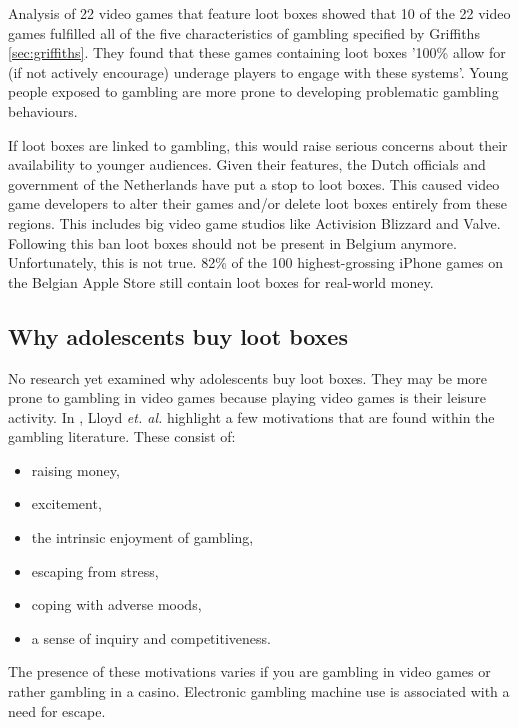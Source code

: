 \documentclass[10pt,twoside,english,a4paper]{coursepaper}
\begin{document}
	Analysis of 22 video games\cite{nature:psycho} that feature loot boxes showed that 10 of the 22 video games fulfilled all of the five characteristics of gambling specified by Griffiths \ref{sec:griffiths}.  They found that these games containing loot boxes  '100\% allow for (if not actively encourage) underage players to engage with these systems'. Young people exposed to gambling are more prone to developing problematic gambling behaviours\cite{springer:risks}. \par
	If loot boxes are linked to gambling, this would raise serious concerns about their availability to younger audiences. Given their features, the Dutch officials and government of the Netherlands have put a stop to loot boxes. This caused video game developers to alter their games and/or delete loot boxes entirely from these regions. This includes big video game studios like Activision Blizzard and Valve. Following this ban loot boxes should not be present in Belgium anymore. Unfortunately, this is not true. 82\% of the 100 highest-grossing iPhone games on the Belgian Apple Store still contain loot boxes for real-world money\cite{ban:belgium}. 

\subsection{Why adolescents buy loot boxes} \label{sec:why}

	 No research yet examined why adolescents buy loot boxes. They may be more prone to gambling in video games because playing video games is their leisure activity. In \cite{report:why}, Lloyd \emph{et. al.} highlight a few motivations that are found within the gambling literature. These consist of:

\begin{itemize}

\item raising money,
\item excitement,
\item the intrinsic enjoyment of gambling,
\item escaping from stress,
\item coping with adverse moods,
\item a sense of inquiry and competitiveness.

\end{itemize}
	
The presence of these motivations varies if you are gambling in video games or rather gambling in a casino. Electronic gambling machine use is associated with a need for escape\cite{electronicgambling}. 
\end{document}
